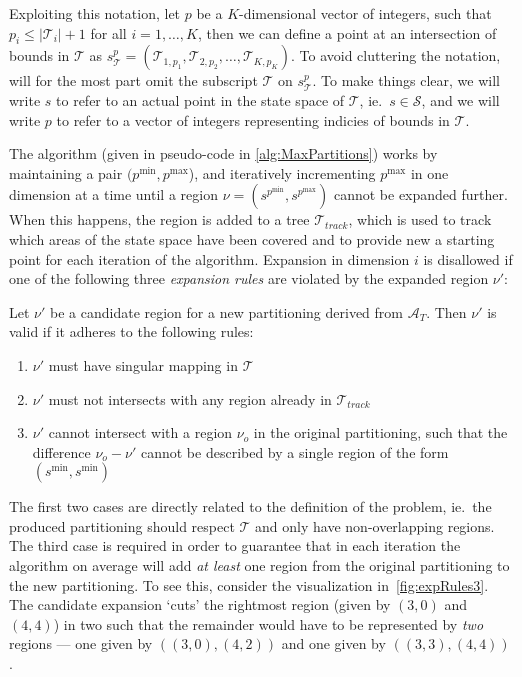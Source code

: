Exploiting this notation, let $p$ be a $K$-dimensional vector of integers, such
that $p_i \leq |\mathcal{T}_i| + 1$ for all $i = 1,\ldots,K$, then we can define
a point at an intersection of bounds in $\mathcal{T}$ as $s^{p}_{\mathcal{T}} =
(\mathcal{T}_{1,p_1}, \mathcal{T}_{2,p_2}, \ldots, \mathcal{T}_{K,p_K})$. To
avoid cluttering the notation, will for the most part omit the subscript
$\mathcal{T}$ on $s^{p}_{\mathcal{T}}$. To make things clear, we will write $s$
to refer to an actual point in the state space of $\mathcal{T}$, ie.\ $s \in
\mathcal{S}$, and we will write $p$ to refer to a vector of integers
representing indicies of bounds in $\mathcal{T}$.

The algorithm (given in pseudo-code in \cref{alg:MaxPartitions}) works
by maintaining a pair $(p^{\min}, p^{\max}$), and iteratively incrementing
$p^{\max}$ in one dimension at a time until a region $\nu = (s^{p^{\min}},
s^{p^{\max}})$ cannot be expanded further. When this happens, the region is
added to a tree $\mathcal{T}_{track}$, which is used to track which areas of the
state space have been covered and to provide new a starting point for each
iteration of the algorithm. Expansion in dimension $i$ is disallowed if one of
the following three \textit{expansion rules} are violated by the expanded region
$\nu'$:

\begin{definition}\label{def:expansionRules}
    Let $\nu'$ be a candidate region for a new partitioning derived from
    $\mathcal{A}_{T}$. Then $\nu'$ is valid if it adheres to the following rules:

    \begin{enumerate}
        \item $\nu'$ must have singular mapping in $\mathcal{T}$
        \item $\nu'$ must not intersects with any region already in
            $\mathcal{T}_{track}$
        \item $\nu'$ cannot intersect with a region $\nu_{o}$ in the original
            partitioning, such that the difference $\nu_{o} - \nu'$ cannot be
            described by a single region of the form $(s^{\min}, s^{\min})$
    \end{enumerate}
\end{definition}

\noindent The first two cases are directly related to the definition of the
problem, ie.\ the produced partitioning should respect $\mathcal{T}$ and only
have non-overlapping regions. The third case is required in order to guarantee
that in each iteration the algorithm on average will add \textit{at least} one
region from the original partitioning to the new partitioning. To see this,
consider the visualization in~\cref{fig:expRules3}. The candidate expansion
`cuts' the rightmost region (given by $(3,0)$ and $(4,4)$) in two such that the
remainder would have to be represented by \textit{two} regions --- one given
by $((3,0), (4,2))$ and one given by $((3,3), (4,4))$.

